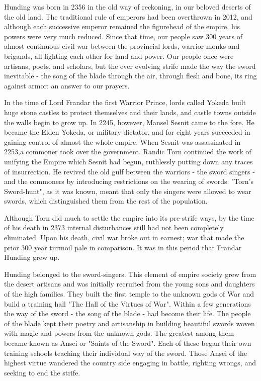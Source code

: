 
 Hunding was born in 2356 in the old way of reckoning, in our beloved deserts of the old land. The traditional rule of emperors had been overthrown in 2012, and although each successive emperor remained the figurehead of the empire, his powers were very much reduced. Since that time, our people saw 300 years of almost continuous civil war between the provincial lords, warrior monks and brigands, all fighting each other for land and power. Our people once were artisans, poets, and scholars, but the ever evolving strife made the way the sword inevitable - the song of the blade through the air, through flesh and bone, its ring against armor: an answer to our prayers.

In the time of Lord Frandar the first Warrior Prince, lords called Yokeda built huge stone castles to protect themselves and their lands, and castle towns outside the walls begin to grow up. In 2245, however, Mansel Sesnit came to the fore. He became the Elden Yokeda, or military dictator, and for eight years succeeded in gaining control of almost the whole empire. When Sesnit was assassinated in 2253,a commoner took over the government. Randic Torn continued the work of unifying the Empire which Sesnit had begun, ruthlessly putting down any traces of insurrection. He revived the old gulf between the warriors - the sword singers - and the commoners by introducing restrictions on the wearing of swords. "Torn's Sword-hunt", as it was known, meant that only the singers were allowed to wear swords, which distinguished them from the rest of the population.

Although Torn did much to settle the empire into its pre-strife ways, by the time of his death in 2373 internal disturbances still had not been completely eliminated. Upon his death, civil war broke out in earnest; war that made the prior 300 year turmoil pale in comparison. It was in this period that Frandar Hunding grew up.

Hunding belonged to the sword-singers. This element of empire society grew from the desert artisans and was initially recruited from the young sons and daughters of the high families. They built the first temple to the unknown gods of War and build a training hall "The Hall of the Virtues of War". Within a few generations the way of the sword - the song of the blade - had become their life. The people of the blade kept their poetry and artisanship in building beautiful swords woven with magic and powers from the unknown gods. The greatest among them became known as Ansei or "Saints of the Sword". Each of these began their own training schools teaching their individual way of the sword. Those Ansei of the highest virtue wandered the country side engaging in battle, righting wrongs, and seeking to end the strife.

